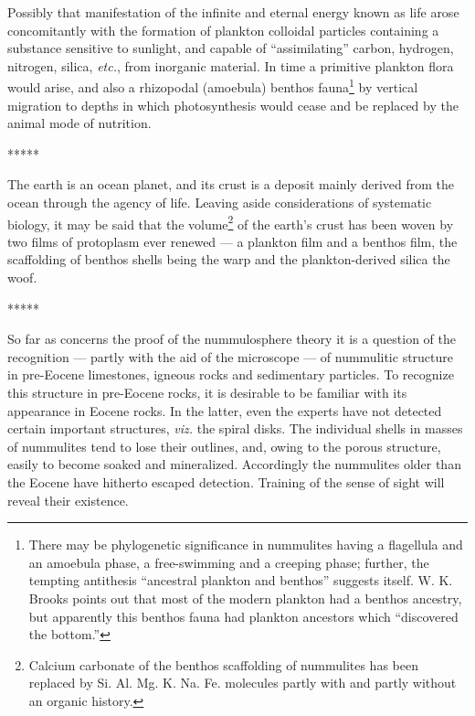 \documentclass[a4paper, 12pt, oneside]{article}
\begin{document}
Possibly that manifestation of the infinite and eternal energy known as life arose concomitantly with the formation of plankton colloidal particles containing a substance sensitive to sunlight, and capable of ``assimilating'' carbon, hydrogen, nitrogen, silica, \emph{etc.}, from inorganic material. In time a primitive plankton flora would arise, and also a rhizopodal (amoebula) benthos fauna\footnote{There may be phylogenetic significance in nummulites having a flagellula and an amoebula phase, a free-swimming and a creeping phase; further, the tempting antithesis ``ancestral plankton and benthos'' suggests itself. W. K. Brooks points out that most of the modern plankton had a benthos ancestry, but apparently this benthos fauna had plankton ancestors which ``discovered the bottom.''} by vertical migration to depths in which photosynthesis would cease and be replaced by the animal mode of nutrition.

\centerline{*\hspace{15mm}*\hspace{15mm}*\hspace{15mm}*\hspace{15mm}*}
\bigskip

The earth is an ocean planet, and its crust is a deposit mainly derived from the ocean through the agency of life. Leaving aside considerations of systematic biology, it may be said that the volume\footnote{Calcium carbonate of the benthos scaffolding of nummulites has been replaced by Si. Al. Mg. K. Na. Fe. molecules partly with and partly without an organic history.} of the earth's crust has been woven by two films of protoplasm ever renewed --- a plankton film and a benthos film, the scaffolding of benthos shells being the warp and the plankton-derived silica the woof.

\centerline{*\hspace{15mm}*\hspace{15mm}*\hspace{15mm}*\hspace{15mm}*}
\bigskip

So far as concerns the proof of the nummulosphere theory it is a question of the recognition --- partly with the aid of the microscope --- of nummulitic structure in pre-Eocene limestones, igneous rocks and sedimentary particles. To recognize this structure in pre-Eocene rocks, it is desirable to be familiar with its appearance in Eocene rocks. In the latter, even the experts have not detected certain important structures, \emph{viz.} the spiral disks. The individual shells in masses of nummulites tend to lose their outlines, and, owing to the porous structure, easily to become soaked and mineralized. Accordingly the nummulites older than the Eocene have hitherto escaped detection. Training of the sense of sight will reveal their existence.
\end{document}
